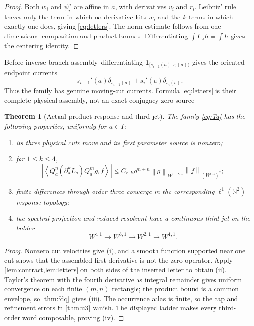 \documentclass[11pt,reqno]{amsart}
\newtheorem{theorem}{Theorem}[section]
\theoremstyle{definition}
\theoremstyle{remark}
\newcommand{\N}{\mathbb N}
\newcommand{\norm}[1]{\left\lVert #1\right\rVert}
\newcommand{\abs}[1]{\left\lvert #1\right\rvert}
\newcommand{\pair}[2]{\left\langle #1,#2\right\rangle}
\begin{document}
\begin{proof}
Both $w_i$ and $\psi_i^a$ are affine in $a$, with derivatives $v_i$ and
$r_i$.  Leibniz' rule leaves only the term in which no derivative hits $w_i$
and the $k$ terms in which exactly one does, giving \eqref{eq:letters}.
The norm estimate follows from one-dimensional composition and product
bounds.  Differentiating $\int L_ah=\int h$ gives the centering identity.
\end{proof}

Before inverse-branch assembly, differentiating
$\mathbf 1_{[s_{i-1}(a),s_i(a))}$ gives the oriented endpoint currents
\[
 -s_{i-1}'(a)\delta_{s_{i-1}(a)}
 +s_i'(a)\delta_{s_i(a)}.
\]
Thus the family has genuine moving-cut currents.  Formula
\eqref{eq:letters} is their complete physical assembly, not an exact-conjugacy
zero source.

\begin{theorem}[Actual product response and third jet]\label{thm:actual}
The family \eqref{eq:Ta} has the following properties, uniformly for
$a\in I$:
\begin{enumerate}[label=(\roman*)]
\item its three physical cuts move and its first parameter source is nonzero;
\item for $1\le k\le4$,
\[
 \abs{\pair{Q_a^n(\partial_a^kL_a)Q_a^m g}{f}}
 \le C_{r,k}\rho^{m+n}
 \norm{g}_{W^{r+k,1}}\norm{f}_{(W^{r,1})^*};
\]
\item finite differences through order three converge in the corresponding
$\ell^1(\N^2)$ response topology;
\item the spectral projection and reduced resolvent have a continuous third
jet on the ladder
\[
 W^{4,1}\to W^{3,1}\to W^{2,1}\to W^{1,1}.
\]
\end{enumerate}
\end{theorem}

\begin{proof}
Nonzero cut velocities give (i), and a smooth function supported near one cut
shows that the assembled first derivative is not the zero operator.  Apply
\cref{lem:contract,lem:letters} on both sides of the inserted letter to obtain
(ii).  Taylor's theorem with the fourth derivative as integral remainder gives
uniform convergence on each finite $(m,n)$ rectangle; the product bound is a
common envelope, so \cref{thm:fdq} gives (iii).  The occurrence atlas is finite,
so the cap and refinement errors in \cref{thm:u3} vanish.  The displayed
ladder makes every third-order word composable, proving (iv).
\end{proof}
\end{document}
